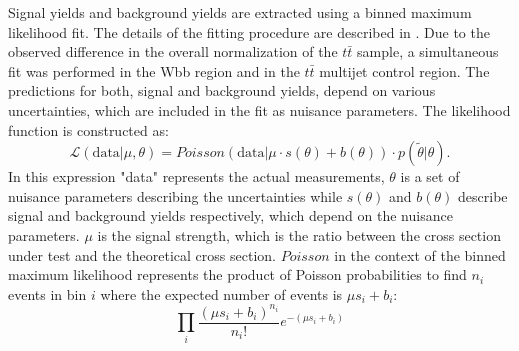 Signal yields and background yields are extracted using a binned maximum likelihood fit. The details of the fitting procedure are described in \cite{ATL-PHYS-PUB-2011-011}. Due to the observed difference in the overall normalization of the $t\bar{t}$ sample, a simultaneous fit was performed in the Wbb region and in the $t\bar{t}$ multijet control region. 
The predictions for both, signal and background yields, depend on various uncertainties, which are included in the fit as nuisance parameters. The likelihood function is constructed as:
\begin{equation}
\mathcal{L}(\mathrm{data}|\mu,\theta) = Poisson(\mathrm{data}|\mu \cdot s(\theta)+b(\theta))\cdot p(\widetilde{\theta} | \theta).
\end{equation} 
In this expression "data" represents the actual measurements, $\theta$ is a set of nuisance parameters describing the uncertainties while $s(\theta)$ and $b(\theta)$ describe signal and background yields respectively, which depend on the nuisance parameters. $\mu$ is the signal strength, which is the ratio between the cross section under test and the theoretical cross section. $Poisson$ in the context of the binned maximum likelihood represents the product of Poisson probabilities to find $n_i$ events in bin $i$ where the expected number of events is $\mu s_i+b_i$:
\begin{equation}
\prod\limits_{i} \frac{(\mu s_i+b_i)^{n_i}}{n_i!}e^{-(\mu s_i+b_i)}
\end{equation}

